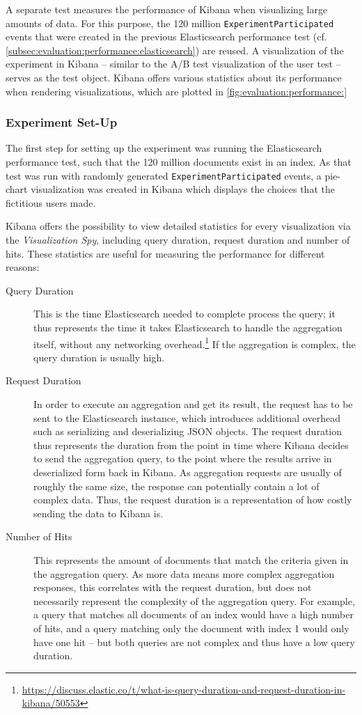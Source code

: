 A separate test measures the performance of Kibana when visualizing large amounts of data.
For this purpose, the 120 million \texttt{ExperimentParticipated} events that were created in the previous Elasticsearch performance test (cf. \cref{subsec:evaluation:performance:elasticsearch}) are reused.
A visualization of the experiment in Kibana -- similar to the A/B test visualization of the user test -- serves as the test object.
Kibana offers various statistics about its performance when rendering visualizations, which are plotted in \cref{fig:evaluation:performance:}


\subsubsection{Experiment Set-Up}

The first step for setting up the experiment was running the Elasticsearch performance test, such that the 120 million documents exist in an index.
As that test was run with randomly generated \texttt{ExperimentParticipated} events, a pie-chart visualization was created in Kibana which displays the choices that the fictitious users made.

Kibana offers the possibility to view detailed statistics for every visualization via the \emph{Visualization Spy}, including query duration, request duration and number of hits.
These statistics are useful for measuring the performance for different reasons:

\begin{description}
\item[Query Duration] This is the time Elasticsearch needed to complete process the query; it thus represents the time it takes Elasticsearch to handle the aggregation itself, without any networking overhead.\footnote{\url{https://discuss.elastic.co/t/what-is-query-duration-and-request-duration-in-kibana/50553}}
If the aggregation is complex, the query duration is usually high.
\item[Request Duration] In order to execute an aggregation and get its result, the request has to be sent to the Elasticsearch instance, which introduces additional overhead such as serializing and deserializing \ac{JSON} objects.
The request duration thus represents the duration from the point in time where Kibana decides to send the aggregation query, to the point where the results arrive in deserialized form back in Kibana.
As aggregation requests are usually of roughly the same size, the response can potentially contain a lot of complex data.
Thus, the request duration is a representation of how costly sending the data to Kibana is.
\item[Number of Hits] This represents the amount of documents that match the criteria given in the aggregation query.
As more data means more complex aggregation responses, this correlates with the request duration, but does not necessarily represent the complexity of the aggregation query.
For example, a query that matches all documents of an index would have a high number of hits, and a query matching only the document with index 1 would only have one hit -- but both queries are not complex and thus have a low query duration.
\end{description}


